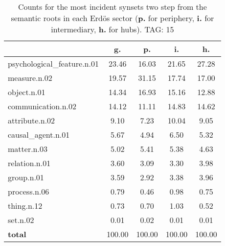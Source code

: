 \begin{table}[h!]
\begin{center}
\begin{tabular}{| l | c | c | c | c |}\hline
 & g. & p. & i. & h. \\\hline
psychological\_feature.n.01 & 23.46  & 16.03  & 21.65  & 27.28 \\\hline
measure.n.02 & 19.57  & 31.15  & 17.74  & 17.00 \\\hline
object.n.01 & 14.34  & 16.93  & 15.16  & 12.88 \\\hline
communication.n.02 & 14.12  & 11.11  & 14.83  & 14.62 \\\hline
attribute.n.02 & 9.10  & 7.23  & 10.04  & 9.05 \\\hline
causal\_agent.n.01 & 5.67  & 4.94  & 6.50  & 5.32 \\\hline
matter.n.03 & 5.02  & 5.41  & 5.38  & 4.63 \\\hline
relation.n.01 & 3.60  & 3.09  & 3.30  & 3.98 \\\hline
group.n.01 & 3.59  & 2.92  & 3.38  & 3.96 \\\hline
process.n.06 & 0.79  & 0.46  & 0.98  & 0.75 \\\hline
thing.n.12 & 0.73  & 0.70  & 1.03  & 0.52 \\\hline
set.n.02 & 0.01  & 0.02  & 0.01  & 0.01 \\\hline
{{\bf total}} & 100.00  & 100.00  & 100.00  & 100.00 \\\hline
\end{tabular}
\caption{Counts for the most incident synsets two step from the semantic roots in each Erd\"os sector ({\bf p.} for periphery, {\bf i.} for intermediary, {\bf h.} for hubs). TAG: 15}
\end{center}
\end{table}